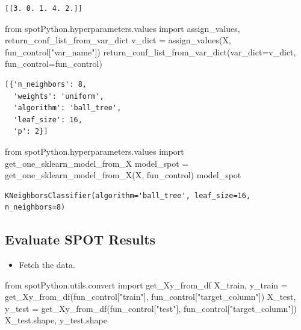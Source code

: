\documentclass[
  letterpaper,
  DIV=11,
  numbers=noendperiod]{scrreprt}
\newenvironment{Shaded}{\begin{snugshade}}{\end{snugshade}}
\newcommand{\ImportTok}[1]{\textcolor[rgb]{0.00,0.46,0.62}{#1}}
\newcommand{\NormalTok}[1]{\textcolor[rgb]{0.00,0.23,0.31}{#1}}
\newcommand{\OperatorTok}[1]{\textcolor[rgb]{0.37,0.37,0.37}{#1}}
\newcommand{\StringTok}[1]{\textcolor[rgb]{0.13,0.47,0.30}{#1}}
\providecommand{\tightlist}{%
  \setlength{\itemsep}{0pt}\setlength{\parskip}{0pt}}\usepackage{longtable,booktabs,array}
\begin{document}
\begin{verbatim}
[[3. 0. 1. 4. 2.]]
\end{verbatim}

\begin{Shaded}
\begin{Highlighting}[]
\ImportTok{from}\NormalTok{ spotPython.hyperparameters.values }\ImportTok{import}\NormalTok{ assign\_values, return\_conf\_list\_from\_var\_dict}
\NormalTok{v\_dict }\OperatorTok{=}\NormalTok{ assign\_values(X, fun\_control[}\StringTok{"var\_name"}\NormalTok{])}
\NormalTok{return\_conf\_list\_from\_var\_dict(var\_dict}\OperatorTok{=}\NormalTok{v\_dict, fun\_control}\OperatorTok{=}\NormalTok{fun\_control)}
\end{Highlighting}
\end{Shaded}

\begin{verbatim}
[{'n_neighbors': 8,
  'weights': 'uniform',
  'algorithm': 'ball_tree',
  'leaf_size': 16,
  'p': 2}]
\end{verbatim}

\begin{Shaded}
\begin{Highlighting}[]
\ImportTok{from}\NormalTok{ spotPython.hyperparameters.values }\ImportTok{import}\NormalTok{ get\_one\_sklearn\_model\_from\_X}
\NormalTok{model\_spot }\OperatorTok{=}\NormalTok{ get\_one\_sklearn\_model\_from\_X(X, fun\_control)}
\NormalTok{model\_spot}
\end{Highlighting}
\end{Shaded}

\begin{verbatim}
KNeighborsClassifier(algorithm='ball_tree', leaf_size=16, n_neighbors=8)
\end{verbatim}

\hypertarget{evaluate-spot-results-3}{%
\subsection{Evaluate SPOT Results}\label{evaluate-spot-results-3}}

\begin{itemize}
\tightlist
\item
  Fetch the data.
\end{itemize}

\begin{Shaded}
\begin{Highlighting}[]
\ImportTok{from}\NormalTok{ spotPython.utils.convert }\ImportTok{import}\NormalTok{ get\_Xy\_from\_df}
\NormalTok{X\_train, y\_train }\OperatorTok{=}\NormalTok{ get\_Xy\_from\_df(fun\_control[}\StringTok{"train"}\NormalTok{], fun\_control[}\StringTok{"target\_column"}\NormalTok{])}
\NormalTok{X\_test, y\_test }\OperatorTok{=}\NormalTok{ get\_Xy\_from\_df(fun\_control[}\StringTok{"test"}\NormalTok{], fun\_control[}\StringTok{"target\_column"}\NormalTok{])}
\NormalTok{X\_test.shape, y\_test.shape}
\end{Highlighting}
\end{Shaded}
\end{document}
